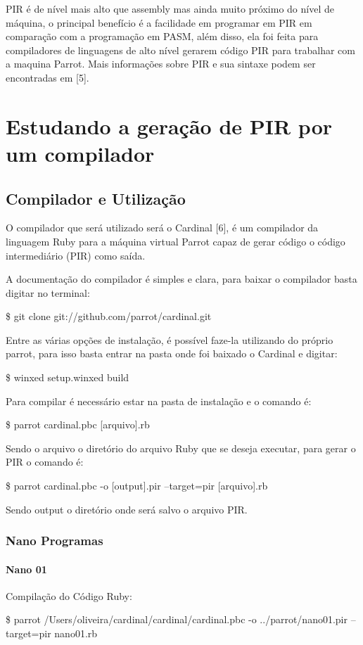 \documentclass[12pt,a4paper,twoside]{report}
\begin{document}
PIR é de nível mais alto que assembly mas ainda muito próximo do nível
de máquina, o principal benefício é a facilidade em programar em PIR
em comparação com a programação em PASM, além disso, ela foi feita
para compiladores de linguagens de alto nível gerarem código PIR para
trabalhar com a maquina Parrot.
Mais informações sobre PIR e sua sintaxe podem ser encontradas em [5].

\chapter{Estudando a geração de PIR por um compilador}
\section{Compilador e Utilização}
O compilador que será utilizado será o Cardinal [6], é um compilador
da linguagem Ruby para a máquina virtual Parrot capaz de gerar código
o código intermediário (PIR) como saída.

A documentação do compilador é simples e clara, para baixar o
compilador basta digitar no terminal:
\begin{terminal}
\$ git clone git://github.com/parrot/cardinal.git
\end{terminal}
Entre as várias opções de instalação, é possível faze-la utilizando do
próprio parrot, para isso basta entrar na pasta onde foi baixado o
Cardinal e digitar:
\begin{terminal}
\$ winxed setup.winxed build
\end{terminal}

Para compilar é necessário estar na pasta de instalação e o comando é:
\begin{terminal}
\$ parrot cardinal.pbc [arquivo].rb
\end{terminal}
Sendo o arquivo o diretório do arquivo Ruby que se deseja executar,
para gerar o PIR o comando é:
\begin{terminal}
\$ parrot cardinal.pbc -o [output].pir --target=pir [arquivo].rb
\end{terminal}
Sendo output o diretório onde será salvo o arquivo PIR.

\subsection{Nano Programas}
\subsubsection{Nano 01}


Compilação do Código Ruby:
\begin{terminal}
\$ parrot /Users/oliveira/cardinal/cardinal/cardinal.pbc -o
../parrot/nano01.pir --target=pir nano01.rb
\end{terminal}

\end{document}
